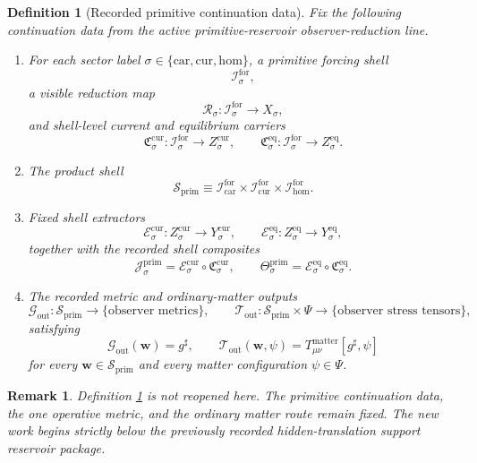 \documentclass[11pt]{article}
\newcommand{\CompletedMetric}{g^{\sharp}}
\newcommand{\Car}{\mathrm{car}}
\newcommand{\Cur}{\mathrm{cur}}
\newcommand{\Hom}{\mathrm{hom}}
\newcommand{\ForSpace}[1]{\mathcal I_{#1}^{\mathrm{for}}}
\newcommand{\PrimShell}{\mathcal S_{\mathrm{prim}}}
\newcommand{\Reduction}[1]{\mathcal R_{#1}}
\newcommand{\CurrentCarrier}[1]{\mathfrak C_{#1}^{\mathrm{cur}}}
\newcommand{\EqCarrier}[1]{\mathfrak C_{#1}^{\mathrm{eq}}}
\newcommand{\CurrentExtract}[1]{\mathscr E_{#1}^{\mathrm{cur}}}
\newcommand{\EqExtract}[1]{\mathscr E_{#1}^{\mathrm{eq}}}
\newcommand{\PrimCurrent}[1]{\mathcal J_{#1}^{\mathrm{prim}}}
\newcommand{\PrimTheta}[1]{\Theta_{#1}^{\mathrm{prim}}}
\newcommand{\MetricOut}{\mathscr G_{\mathrm{out}}}
\newcommand{\MatterOut}{\mathscr T_{\mathrm{out}}}
\newtheorem{definition}{Definition}
\newtheorem{remark}{Remark}
\begin{document}
\begin{definition}[Recorded primitive continuation data]
\label{def:fixed}
Fix the following continuation data from the active primitive-reservoir observer-reduction line.
\begin{enumerate}
    \item For each sector label \(\sigma\in\{\Car,\Cur,\Hom\}\), a primitive forcing shell
    \[
    \ForSpace{\sigma},
    \]
    a visible reduction map
    \[
    \Reduction{\sigma}:\ForSpace{\sigma}\to X_{\sigma},
    \]
    and shell-level current and equilibrium carriers
    \[
    \CurrentCarrier{\sigma}:\ForSpace{\sigma}\to Z_{\sigma}^{\mathrm{cur}},
    \qquad
    \EqCarrier{\sigma}:\ForSpace{\sigma}\to Z_{\sigma}^{\mathrm{eq}}.
    \]
    \item The product shell
    \[
    \PrimShell
    \equiv
    \ForSpace{\Car}\times \ForSpace{\Cur}\times \ForSpace{\Hom}.
    \]
    \item Fixed shell extractors
    \[
    \CurrentExtract{\sigma}:Z_{\sigma}^{\mathrm{cur}}\to Y_{\sigma}^{\mathrm{cur}},
    \qquad
    \EqExtract{\sigma}:Z_{\sigma}^{\mathrm{eq}}\to Y_{\sigma}^{\mathrm{eq}},
    \]
    together with the recorded shell composites
    \begin{equation}
    \PrimCurrent{\sigma}
    =
    \CurrentExtract{\sigma}\circ \CurrentCarrier{\sigma},
    \qquad
    \PrimTheta{\sigma}
    =
    \EqExtract{\sigma}\circ \EqCarrier{\sigma}.
    \label{eq:primcomposites}
    \end{equation}
    \item The recorded metric and ordinary-matter outputs
    \[
    \MetricOut:\PrimShell\to\{\text{observer metrics}\},
    \qquad
    \MatterOut:\PrimShell\times\Psi\to\{\text{observer stress tensors}\},
    \]
    satisfying
    \begin{equation}
    \MetricOut(\mathbf w)=\CompletedMetric,
    \qquad
    \MatterOut(\mathbf w,\psi)
    =
    T_{\mu\nu}^{\mathrm{matter}}[\CompletedMetric,\psi]
    \label{eq:fixedoutputs}
    \end{equation}
    for every \(\mathbf w\in\PrimShell\) and every matter configuration \(\psi\in\Psi\).
\end{enumerate}
\end{definition}

\begin{remark}
Definition \ref{def:fixed} is not reopened here. The primitive continuation data, the one operative metric, and the ordinary matter route remain fixed. The new work begins strictly below the previously recorded hidden-translation support reservoir package.
\end{remark}
\end{document}
